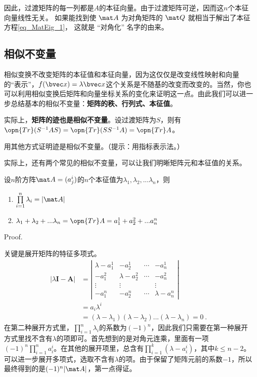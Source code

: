 {因此，过渡矩阵的每一列都是$A$的本征向量。由于过渡矩阵可逆，因而这$n$个本征向量线性无关。
如果能找到使 $\mat A$ 为对角矩阵的 $\mat Q$ 就相当于解出了本征方程\autoref{eq_MatEig_1}， 这就是 “对角化” 名字的由来。

\subsection{相似不变量}
相似变换不改变矩阵的本征值和本征向量，因为这仅仅是改变线性映射和向量的“表示”，$f(\bvec x)=\lambda \bvec x$这个关系是不随基的改变而改变的。当然，你也可以利用相似变换后矩阵和向量坐标关系的变化来证明这一点。由此我们可以进一步总结基本的相似不变量：\textbf{矩阵的秩、行列式、本征值}。

实际上，\textbf{矩阵的迹也是相似不变量}。设过渡矩阵为$S$，则有$\opn {Tr}(S^{-1}AS)=\opn {Tr}(SS^{-1}A)=\opn {Tr}A$。
\begin{exercise}{}
用其他方式证明迹是相似不变量。（提示：用指标表示法。）
\end{exercise}
实际上，还有两个常见的相似不变量，可以让我们明晰矩阵元和本征值的关系。
\begin{theorem}{}\label{the_MatEig_3}
设$n$阶方阵$\mat A=(a^i_j)$的$n$个本征值为$\lambda_1,\lambda_2,...\lambda_n$，则
\begin{enumerate}
\item $\prod\limits^n_{i=1}\lambda_i=|\mat A|$
\item $\lambda_1+\lambda_2+...\lambda_n=\opn{Tr}A =a^1_1+a^2_2+...a^n_n$
\end{enumerate}
\end{theorem}
Proof.

关键是展开矩阵的特征多项式。
\begin{equation}
\begin{aligned}
|\lambda \boldsymbol{I}-\boldsymbol{A}| & =\left|\begin{array}{cccc}
\lambda-a^1_{1} & -a^1_{2} & \cdots & -a^1_{n} \\
-a^2_{1} & \lambda-a^2_{2} & \cdots & -a^2_{ n} \\
\vdots & \vdots & & \vdots \\
-a^n_{ 1} & -a^n_{ 2} & \cdots & \lambda-a^n_{ n}
\end{array}\right| \\
&=a_i\lambda^i\\
& =(\lambda-\lambda_1)(\lambda-\lambda_2)...(\lambda-\lambda_n)=0~.
\end{aligned}
\end{equation}
在第二种展开方式里，$\prod\limits^n_{i=1}\lambda_i$的系数为$(-1)^n$，因此我们只需要在第一种展开方式里找不含有$\lambda$的项即可。首先想到的是对角元连乘，里面有一项$(-1)^{n}\prod \limits^n_{i=1}a^i_i$。在其他的展开项里，总含有$\prod \limits^k_{i=1}(\lambda-a^i_i)$，其中$k\le n-2$。可以进一步展开多项式，选取不含有$\lambda$的项。由于保留了矩阵元前的系数$-1$，所以最终得到的是$(-1)^n |\mat A|$，第一点得证。

}
